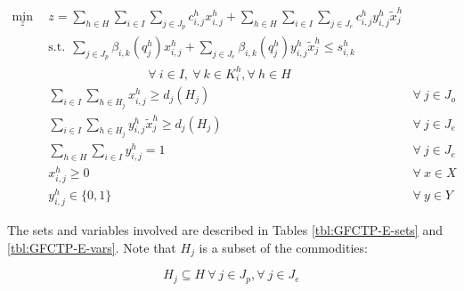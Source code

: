\begin{subequations}\label{eqs:GFCTP-E}
  \begin{align}
    \label{eq:GRCTP-E_obj}
    \min_{z} \:\: 
    & 
    z = \sum_{h \in H}\sum_{i \in I}\sum_{j \in J_{p}}c_{i,j}^{h} x_{i,j}^{h} 
    + \sum_{h \in H}\sum_{i \in I}\sum_{j \in J_{e}}c_{i,j}^{h} y_{i,j}^{h} \tilde{x}_{j}^{h}
    && \\
    \label{eq:GRCTP-E_sup}
    &
    \text{s.t.} \:\: 
    \sum_{j \in J_{p}}\beta_{i,k}(q_{j}^{h}) x_{i,j}^{h}
    + \sum_{j \in J_{e}}\beta_{i,k}(q_{j}^{h}) y_{i,j}^{h} \tilde{x}_{j}^{h} \leq s_{i,k}^{h} \nonumber \\
    &
    \qquad\qquad\qquad\qquad
    \forall \: i \in I, \: \forall \: k \in K_{i}^{h}, \forall \: {h \in H}\\
    \label{eq:GRCTP-E_dem_p}
    &
    \sum_{i \in I}\sum_{h \in H_{j}} x_{i,j}^{h} \geq d_{j}(H_{j})
    &
    \forall \: j \in J_{o} &\\
    \label{eq:GRCTP-E_dem_e}
    &
    \sum_{i \in I}\sum_{h \in H_{j}} y_{i,j}^{h} \tilde{x}_{j}^{h} \geq d_{j}(H_{j}) 
    &
    \forall \: j \in J_{e}  &\\
    \label{eq:GRCTP-E_sumy}
    &
    \sum_{h \in H}\sum_{i \in I} y_{i,j}^{h} = 1
    &
    \forall \: j \in J_{e}  &\\
    \label{eq:GRCTP-E_x}
    &
    x_{i,j}^{h} \geq 0
    &
    \forall \: x \in X  &\\
    \label{eq:GRCTP-E_y}
    &
    y_{i,j}^{h} \in \{0,1\}
    &
    \forall \: y \in Y &
  \end{align}
\end{subequations}

The sets and variables involved are described in Tables \ref{tbl:GFCTP-E-sets}
and \ref{tbl:GFCTP-E-vars}. Note that $H_{j}$ is a subset of the commodities:

\begin{equation}
  H_{j} \subseteq H \: \forall \: j \in J_{p}, \forall \: j \in J_{e}
\end{equation}

